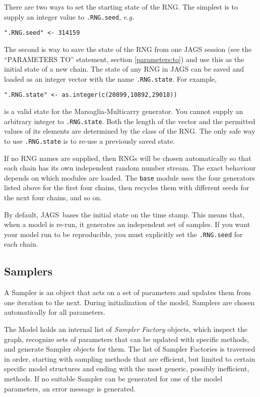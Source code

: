 \documentclass[11pt, a4paper, titlepage]{report}
\newcommand{\JAGS}{\textsf{JAGS}}
\begin{document}
There are two ways to set the starting state of the RNG. The simplest
is to supply an integer value to \texttt{.RNG.seed}, {\em e.g.}
\begin{verbatim}
".RNG.seed" <- 314159
\end{verbatim}
The second is way to save the state of the RNG from one JAGS session
(see the ``PARAMETERS TO'' statement, section \ref{parameters:to}) and
use this as the initial state of a new chain. The state of any RNG in
JAGS can be saved and loaded as an integer vector with the name
\texttt{.RNG.state}. For example,
\begin{verbatim}
".RNG.state" <- as.integer(c(20899,10892,29018))
\end{verbatim}
is a valid state for the Marsaglia-Multicarry generator.  You cannot
supply an arbitrary integer to \texttt{.RNG.state}. Both the length of
the vector and the permitted values of its elements are determined by
the class of the RNG. The only safe way to use \texttt{.RNG.state} is
to re-use a previously saved state.

If no RNG names are supplied, then RNGs will be chosen automatically
so that each chain has its own independent random number stream.  The
exact behaviour depends on which modules are loaded. The \texttt{base}
module uses the four generators listed above for the first four
chains, then recycles them with different seeds for the next four
chains, and so on.  

By default, \JAGS\ bases the initial state on the time stamp. This
means that, when a model is re-run, it generates an independent set of
samples. If you want your model run to be reproducible, you must
explicitly set the \verb+.RNG.seed+ for each chain.

\subsection{Samplers}

A Sampler is an object that acts on a set of parameters and updates
them from one iteration to the next. During initialization of the
model, Samplers are chosen automatically for all parameters. 

The Model holds an internal list of {\em Sampler Factory} objects,
which inspect the graph, recognize sets of parameters that can be
updated with specific methods, and generate Sampler objects for
them. The list of Sampler Factories is traversed in order, starting with
sampling methods that are efficient, but limited to certain specific
model structures and ending with the most generic, possibly
inefficient, methods. If no suitable Sampler can be generated for one
of the model parameters, an error message is generated.
\end{document}
